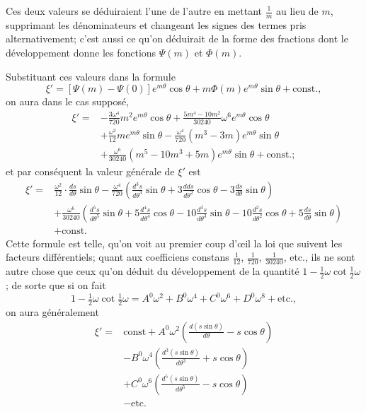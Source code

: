 \documentclass{article}
\begin{document}
Ces deux valeurs se déduiraient l'une de l'autre en mettant $\frac{1}{m}$ au lieu de $m$, supprimant les dénominateurs et changeant les signes des termes pris alternativement; c'est aussi ce qu'on déduirait de la forme des fractions dont le développement donne les fonctions $\Psi(m)$ et $\Phi(m)$.

Substituant ces valeurs dans la formule
\[ \xi'=[\Psi(m)-\Psi(0)]e^{m\theta}\cos\theta+m\Phi(m)e^{m\theta}\sin\theta+\text{const.}, \]
on aura dans le cas supposé,
\[ \begin{aligned} \xi'={}&-\frac{3\omega^{4}}{720}m^{2}e^{m\theta}\cos\theta+\frac{5m^{4}-10m^{2}}{30240}\omega^{6}e^{m\theta}\cos\theta\\ &+\frac{\omega^{2}}{12}me^{m\theta}\sin\theta-\frac{\omega^{4}}{720}(m^{3}-3m)e^{m\theta}\sin\theta\\ &+\frac{\omega^{6}}{30240}(m^{5}-10m^{3}+5m)e^{m\theta}\sin\theta+\text{const.}; \end{aligned} \]
et par conséquent la valeur générale de $\xi'$ est
\[ \begin{aligned} \xi'={}&\frac{\omega^{2}}{12}\cdot\frac{ds}{d\theta}\sin\theta-\frac{\omega^{4}}{720}\left(\frac{d^{3}s}{d\theta^{3}}\sin\theta+3\frac{dds}{d\theta^{2}}\cos\theta-3\frac{ds}{d\theta}\sin\theta\right)\\ &+\frac{\omega^{6}}{30240}\left(\frac{d^{5}s}{d\theta^{5}}\sin\theta+5\frac{d^{4}s}{d\theta^{4}}\cos\theta-10\frac{d^{3}s}{d\theta^{3}}\sin\theta-10\frac{d^{2}s}{d\theta^{2}}\cos\theta+5\frac{ds}{d\theta}\sin\theta\right)\\ &+\text{const.} \end{aligned} \]
Cette formule est telle, qu'on voit au premier coup d'œil la loi que suivent les facteurs différentiels; quant aux coefficiens constans $\frac{1}{12}$, $\frac{1}{720}$, $\frac{1}{30240}$, etc., ils ne sont autre chose que ceux qu'on déduit du développement de la quantité $1-\frac{1}{2}\omega\cot\frac{1}{2}\omega$; de sorte que si on fait
\[ 1-\tfrac{1}{2}\omega\cot\tfrac{1}{2}\omega=A^{0}\omega^{2}+B^{0}\omega^{4}+C^{0}\omega^{6}+D^{0}\omega^{8}+\text{etc.}, \]
on aura généralement
\[ \begin{aligned} \xi'={}&\text{const}+A^{0}\omega^{2}\left(\frac{d(s\sin\theta)}{d\theta}-s\cos\theta\right)\\ &-B^{0}\omega^{4}\left(\frac{d^{3}(s\sin\theta)}{d\theta^{3}}+s\cos\theta\right)\\ &+C^{0}\omega^{6}\left(\frac{d^{5}(s\sin\theta)}{d\theta^{5}}-s\cos\theta\right)\\ &-\text{etc.} \end{aligned} \]
\end{document}
